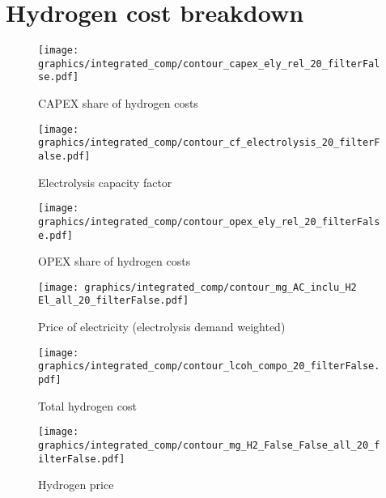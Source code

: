 \section{Hydrogen cost breakdown}
\label{subsec:electrolysis_op_comp}



\begin{figure*}[h!]
    \centering
    \begin{subfigure}[b]{0.45\linewidth}
        \centering
        \texttt{[image: graphics/integrated\_comp/contour\_capex\_ely\_rel\_20\_filterFalse.pdf]}
        \caption{CAPEX share of hydrogen costs}
        \label{fig:capex-rel}
    \end{subfigure}
    \hfill
    \begin{subfigure}[b]{0.45\linewidth}
        \centering
        \texttt{[image: graphics/integrated\_comp/contour\_cf\_electrolysis\_20\_filterFalse.pdf]}
        \caption{Electrolysis capacity factor}
        \label{fig:ely-cf}
    \end{subfigure}
    \hfill
    \begin{subfigure}[b]{0.45\linewidth}
        \centering
        \texttt{[image: graphics/integrated\_comp/contour\_opex\_ely\_rel\_20\_filterFalse.pdf]}
        \caption{OPEX share of hydrogen costs}
        \label{fig:opex-rel}
    \end{subfigure}
    \hfill
    \begin{subfigure}[b]{0.45\linewidth}
        \centering
        \texttt{[image: graphics/integrated\_comp/contour\_mg\_AC\_inclu\_H2 El\_all\_20\_filterFalse.pdf]}
        \caption{Price of electricity (electrolysis demand weighted)}
        \label{fig:electricity-price}
    \end{subfigure}
    \hfill
    \begin{subfigure}[b]{0.45\linewidth}
        \centering
        \texttt{[image: graphics/integrated\_comp/contour\_lcoh\_compo\_20\_filterFalse.pdf]}
        \caption{Total hydrogen cost}
        \label{fig:hydrogen-cost}
    \end{subfigure}
    \hfill
    \begin{subfigure}[b]{0.45\linewidth}
        \centering
        \texttt{[image: graphics/integrated\_comp/contour\_mg\_H2\_False\_False\_all\_20\_filterFalse.pdf]}
        \caption{Hydrogen price}
        \label{fig:hydrogen-price}
    \end{subfigure}
    \hfill
    
    \caption{Cost components of hydrogen electrolysis (CAPEX \ref{fig:capex-rel} and \ref{fig:opex-rel}) and combined cost of hydrogen via electrolysis (\ref{fig:hydrogen-cost}) along with the electrolysers capacity factor (\ref{fig:ely-cf} (influencing the CAPEX share)) and price of electricity (\ref{fig:fig:electricity-price}) (influencing the OPEX share). Marginal price of hydrogen (fig:hydrogen-price) for comparison.}
    \label{fig:electrolysis_op_comp}
\end{figure*}

\clearpage